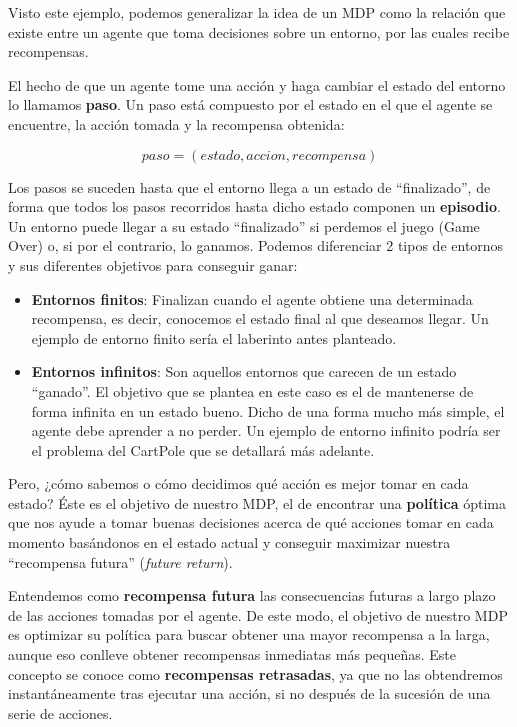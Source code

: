 Visto este ejemplo, podemos generalizar la idea de un MDP como la relación que existe entre un agente que toma decisiones sobre un entorno, por las cuales recibe recompensas.

El hecho de que un agente tome una acción y haga cambiar el estado del entorno lo llamamos \textbf{paso}. Un paso está compuesto por el estado en el que el agente se encuentre, la acción tomada y la recompensa obtenida:

\begin{equation}
    paso = (estado, accion, recompensa)
\end{equation}

Los pasos se suceden hasta que el entorno llega a un estado de “finalizado”, de forma que todos los pasos recorridos hasta dicho estado componen un \textbf{episodio}. Un entorno puede llegar a su estado “finalizado” si perdemos el juego (Game Over) o, si por el contrario, lo ganamos. Podemos diferenciar 2 tipos de entornos y sus diferentes objetivos para conseguir ganar:

\begin{itemize}
    \item \textbf{Entornos finitos}: Finalizan cuando el agente obtiene una determinada recompensa, es decir, conocemos el estado final al que deseamos llegar. Un ejemplo de entorno finito sería el laberinto antes planteado.
    \item \textbf{Entornos infinitos}: Son aquellos entornos que carecen de un estado “ganado”. El objetivo que se plantea en este caso es el de mantenerse de forma infinita en un estado bueno. Dicho de una forma mucho más simple, el agente debe aprender a no perder. Un ejemplo de entorno infinito podría ser el problema del CartPole que se detallará más adelante.
\end{itemize}

Pero, ¿cómo sabemos o cómo decidimos qué acción es mejor tomar en cada estado? Éste es el objetivo de nuestro MDP, el de encontrar una \textbf{política} óptima que nos ayude a tomar buenas decisiones acerca de qué acciones tomar en cada momento basándonos en el estado actual y conseguir maximizar nuestra “recompensa futura” (\textit{future return}).

Entendemos como \textbf{recompensa futura} las consecuencias futuras a largo plazo de las acciones tomadas por el agente. De este modo, el objetivo de nuestro MDP es optimizar su política para buscar obtener una mayor recompensa a la larga, aunque eso conlleve obtener recompensas inmediatas más pequeñas. Este concepto se conoce como \textbf{recompensas retrasadas}, ya que no las obtendremos instantáneamente tras ejecutar una acción, si no después de la sucesión de una serie de acciones.

